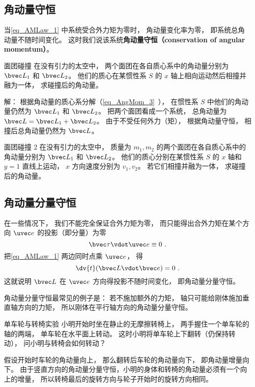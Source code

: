 \subsection{角动量守恒}
当\autoref{eq_AMLaw_1} 中系统受合外力矩为零时， 角动量变化率为零， 即系统总角动量不随时间变化。 这时我们说该系统\textbf{角动量守恒（conservation of angular momentum）}。

\begin{example}{面团碰撞}
在没有引力的太空中， 两个面团在各自质心系中的角动量分别为 $\bvec L_1$ 和 $\bvec L_2$。 他们的质心在某惯性系 $S$ 的 $x$ 轴上相向运动然后相撞并融为一体， 求碰撞后的角动量。

解： 根据角动量的质心系分解（\autoref{eq_AngMom_3}~）， 在惯性系 $S$ 中他们的角动量仍然为 $\bvec L_1$ 和 $\bvec L_2$。 把两个面团看成一个系统， 总角动量为 $\bvec L = \bvec L_1 + \bvec L_2$。 由于不受任何外力（矩）， 根据角动量守恒， 相撞后总角动量仍然为 $\bvec L$。
\end{example}

\begin{exercise}{面团碰撞 2}
在没有引力的太空中， 质量为 $m_1, m_2$ 的两个面团在各自质心系中的角动量分别为 $\bvec L_1$ 和 $\bvec L_2$。 他们的质心分别在某惯性系 $S$ 的 $x$ 轴和 $y = 1$ 直线上运动， $x$ 方向速度分别为 $v_1, v_2$。 若它们相撞并融为一体， 求碰撞后的角动量。
\end{exercise}

\subsection{角动量分量守恒}
在一些情况下， 我们不能完全保证合外力矩为零， 而只能得出合外力矩在某个方向 $\uvec e$ 的投影（即分量）为零
\begin{equation}
\bvec \tau \vdot \uvec e \equiv 0~.
\end{equation}
把\autoref{eq_AMLaw_1} 两边同时点乘 $\uvec e$， 得
\begin{equation}
\dv{t} (\bvec L \vdot \bvec e) = 0~.
\end{equation}
这就说明 $\bvec L$ 在 $\uvec e$ 方向得投影不随时间变化， 即角动量分量守恒。

角动量分量守恒最常见的例子是： 若不施加额外的力矩， 轴只可能给刚体施加垂直轴方向的力矩， 所以刚体在平行轴方向的角动量分量守恒。

\begin{example}{单车轮与转椅实验}
小明开始时坐在静止的无摩擦转椅上， 两手握住一个单车轮的轴的两端， 单车轮在水平面上转动。 这时小明将单车轮上下翻转（仍保持转动）， 问小明与转椅会如何转动？

假设开始时车轮的角动量向上， 那么翻转后车轮的角动量向下， 即角动量增量向下。 由于竖直方向的角动量分量守恒，小明的身体和转椅的角动量必须有一个向上的增量， 所以转椅最后的旋转方向与轮子开始时的旋转方向相同。
\end{example}

